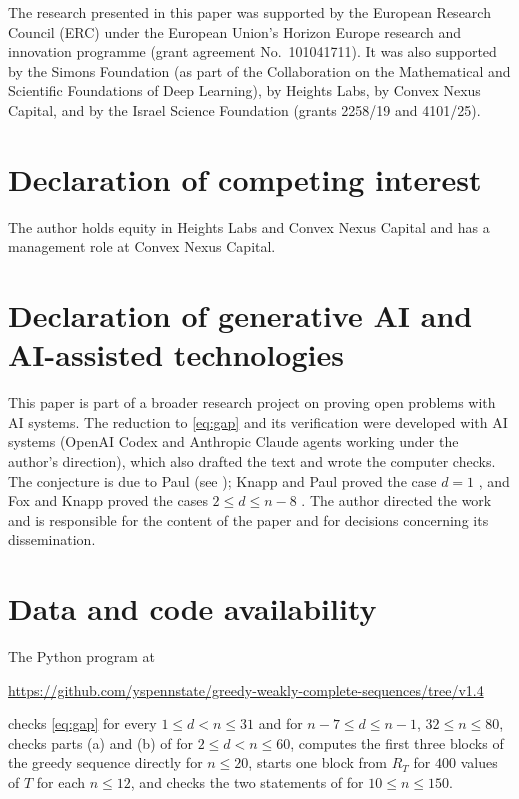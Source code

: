 \documentclass[11pt]{article}
\theoremstyle{remark}
\begin{document}
The research presented in this paper was supported by the European Research Council (ERC) under the European
Union's Horizon Europe research and innovation programme (grant agreement No.\ 101041711). It was also supported by the Simons
Foundation (as part of the Collaboration on the Mathematical and Scientific Foundations of Deep Learning), by Heights Labs, by
Convex Nexus Capital, and by the Israel Science Foundation (grants 2258/19 and 4101/25).

\section*{Declaration of competing interest}

The author holds equity in Heights Labs and Convex Nexus Capital and has a management role at Convex Nexus Capital.

\section*{Declaration of generative AI and AI-assisted technologies}

This paper is part of a broader research project on proving open problems with AI systems.
The reduction to \eqref{eq:gap} and its verification were developed with AI systems (OpenAI Codex and Anthropic Claude
agents working under the author's direction), which also drafted the text and wrote the computer checks. The
conjecture is due to Paul (see \cite[Conjecture~B]{KP}); Knapp and Paul proved the case $d=1$ \cite[Theorem~2]{KP},
and Fox and Knapp proved the cases $2\le d\le n-8$ \cite{FK}.
The author directed the work and is responsible for the content of the paper and for decisions concerning its
dissemination.

\section*{Data and code availability}

The Python program at
\begin{center}
\url{https://github.com/yspennstate/greedy-weakly-complete-sequences/tree/v1.4}
\end{center}
checks \eqref{eq:gap} for every $1\le d<n\le 31$ and for $n-7\le d\le n-1$, $32\le n\le 80$, checks parts (a) and (b)
of  for $2\le d<n\le 60$, computes the first three blocks of the greedy sequence directly for
$n\le 20$, starts one block from $R_T$ for $400$ values of $T$ for each $n\le 12$, and checks the two statements of
 for $10\le n\le 150$.
\end{document}
